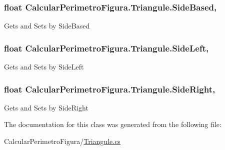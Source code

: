 \subsubsection[{Side\+Based}]{\setlength{\rightskip}{0pt plus 5cm}float Calcular\+Perimetro\+Figura.\+Triangule.\+Side\+Based\hspace{0.3cm}{\ttfamily [get]}, {\ttfamily [set]}}\label{class_calcular_perimetro_figura_1_1_triangule_a2c9f3eb7675f21be2242cfd98040d11d}


Gets and Sets by Side\+Based 

\hypertarget{class_calcular_perimetro_figura_1_1_triangule_acce850765f116bbe94c5fb1a775ad6d8}{}
\subsubsection[{Side\+Left}]{\setlength{\rightskip}{0pt plus 5cm}float Calcular\+Perimetro\+Figura.\+Triangule.\+Side\+Left\hspace{0.3cm}{\ttfamily [get]}, {\ttfamily [set]}}\label{class_calcular_perimetro_figura_1_1_triangule_acce850765f116bbe94c5fb1a775ad6d8}


Gets and Sets by Side\+Left 

\hypertarget{class_calcular_perimetro_figura_1_1_triangule_a157c5ff0a52ca511f4f7ea6ed0aaf7d1}{}
\subsubsection[{Side\+Right}]{\setlength{\rightskip}{0pt plus 5cm}float Calcular\+Perimetro\+Figura.\+Triangule.\+Side\+Right\hspace{0.3cm}{\ttfamily [get]}, {\ttfamily [set]}}\label{class_calcular_perimetro_figura_1_1_triangule_a157c5ff0a52ca511f4f7ea6ed0aaf7d1}


Gets and Sets by Side\+Right 



The documentation for this class was generated from the following file\+:\begin{DoxyCompactItemize}
\item 
Calcular\+Perimetro\+Figura/\hyperlink{_triangule_8cs}{Triangule.\+cs}\end{DoxyCompactItemize}
